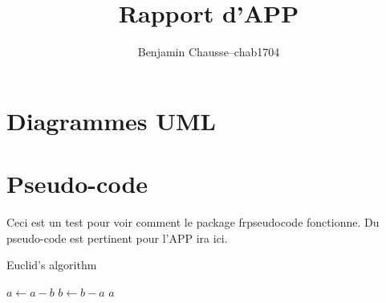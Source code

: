 \documentclass[a11paper, 11pt]{article}
\title{Rapport d'APP}
\author{
  \addtolength{\tabcolsep}{-0.4em}
  \begin{tabular}{rcl} %
  Benjamin Chausse & -- & chab1704 \\
  \end{tabular}
}
\begin{document}
\maketitle
\newpage
\tableofcontents
\newpage

\section{Diagrammes UML}

\section{Pseudo-code}

Ceci est un test pour voir comment le package frpseudocode fonctionne.
Du pseudo-code est pertinent pour l'APP ira ici.

\begin{algorithm}
\caption{Euclid's algorithm}\label{alg:euclid}
\begin{algorithmic}[1]
        \State $a \gets a - b$
      \Else
        \State $b \gets b - a$
      \EndIf
    \EndWhile
    \State \Return $a$
  \EndFunction
\end{algorithmic}
\end{algorithm}



\end{document}
